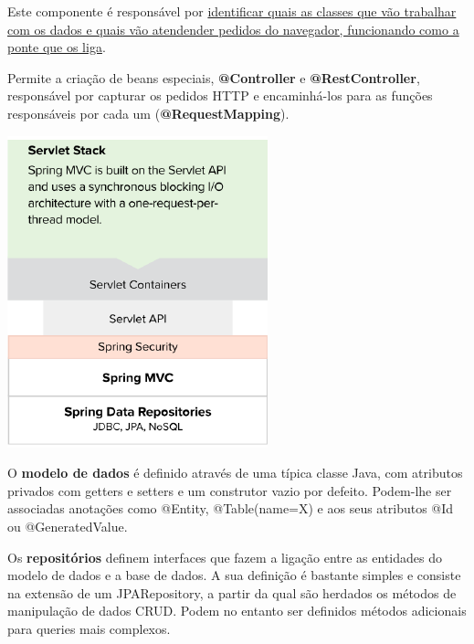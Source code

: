 \documentclass{article}
\begin{document}
Este componente é responsável por \uline{identificar quais as classes que vão trabalhar
 com os dados e quais vão atendender pedidos do navegador, funcionando como
a ponte que os liga}.

Permite a criação de beans especiais, \textbf{@Controller} e
\textbf{@RestController}, responsável por capturar os
pedidos HTTP e encaminhá-los para as funções responsáveis por
cada um (\textbf{@RequestMapping}).

\begin{center}
  \includegraphics[scale=0.5]{91}
\end{center}

O \textbf{modelo de dados} é definido através de uma típica classe Java,
com atributos privados com getters e setters e um construtor vazio por defeito.
Podem-lhe ser associadas anotações como @Entity, @Table(name=X) e aos
seus atributos @Id ou @GeneratedValue.

Os \textbf{repositórios} definem interfaces que fazem a ligação entre as
entidades do modelo de dados e a base de dados. A sua definição é
bastante simples e consiste na extensão de um JPARepository, a partir da
qual são herdados os métodos de manipulação de dados CRUD. Podem no
entanto ser definidos métodos adicionais para queries mais complexos.
\end{document}
